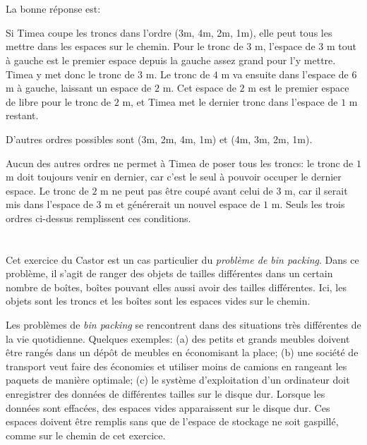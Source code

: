 {{\section*{\BrochureSolution}
La bonne réponse est:

{\centering%
\par}

Si Timea coupe les troncs dans l’ordre (3\thinspace{}m, 4\thinspace{}m, 2\thinspace{}m, 1\thinspace{}m), elle peut tous les mettre dans les espaces sur le chemin.
Pour le tronc de $3$ m, l’espace de $3$ m tout à gauche est le premier espace depuis la gauche assez grand pour l’y mettre. Timea y met donc le tronc de $3$ m. Le tronc de $4$ m va ensuite dans l’espace de $6$ m à gauche, laissant un espace de $2$ m. Cet espace de $2$ m est le premier espace de libre pour le tronc de $2$ m, et Timea met le dernier tronc dans l’espace de $1$ m restant.

D’autres ordres possibles sont (3\thinspace{}m, 2\thinspace{}m, 4\thinspace{}m, 1\thinspace{}m) et (4\thinspace{}m, 3\thinspace{}m, 2\thinspace{}m, 1\thinspace{}m).

Aucun des autres ordres ne permet à Timea de poser tous les troncs: le tronc de $1$ m doit toujours venir en dernier, car c’est le seul à pouvoir occuper le dernier espace. Le tronc de $2$ m ne peut pas être coupé avant celui de $3$ m, car il serait mis dans l’espace de $3$ m et générerait un nouvel espace de $1$ m. Seuls les trois ordres ci-dessus remplissent ces conditions.



\section*{\BrochureItsInformatics}
Cet exercice du Castor est un cas particulier du \emph{problème de bin packing}. Dans ce problème, il s’agit de ranger des objets de tailles différentes dans un certain nombre de boîtes, boîtes pouvant elles aussi avoir des tailles différentes. Ici, les objets sont les troncs et les boîtes sont les espaces vides sur le chemin.

Les problèmes de \emph{bin packing} se rencontrent dans des situations très différentes de la vie quotidienne. Quelques exemples: (a) des petits et grands meubles doivent être rangés dans un dépôt de meubles en économisant la place; (b) une société de transport veut faire des économies et utiliser moins de camions en rangeant les paquets de manière optimale; (c) le système d’exploitation d’un ordinateur doit enregistrer des données de différentes tailles sur le disque dur. Lorsque les données sont effacées, des espaces vides apparaissent sur le disque dur. Ces espaces doivent être remplis sans que de l’espace de stockage ne soit gaspillé, comme sur le chemin de cet exercice.

}}

